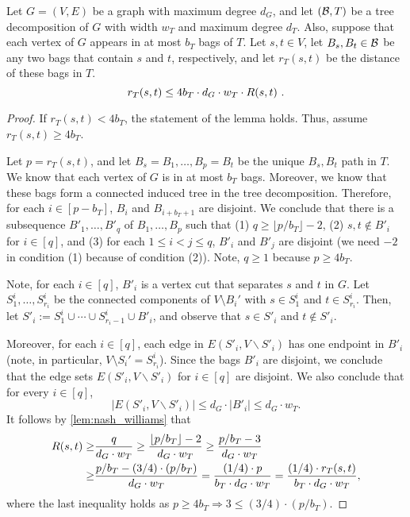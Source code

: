 \begin{lemma}
\label{lem:er_vs_tree_decomp_distance}
    Let $G=(V,E)$ be a graph with maximum degree $d_G$, and let $({\cal B}, T)$ be a tree decomposition of $G$ with width $w_T$ and maximum degree $d_T$.
    Also, suppose that each vertex of $G$ appears in at most $b_T$ bags of $T$.
    Let $s,t\in V$, let $B_s, B_t\in {\cal B}$ be any two bags that contain $s$ and $t$, respectively, and let $r_T(s,t)$ be the distance of these bags in $T$. 
    \[
    r_T(s,t) \leq {4b_T\cdot d_G\cdot w_T}\cdot R(s,t)  \ \text{.}
    \]
\end{lemma}
\begin{proof}
    If $r_T(s,t) < 4b_T$, the statement of the lemma holds. Thus, assume $r_T(s,t) \geq 4b_T$.
    
    Let $p = r_T(s,t)$, and let $B_s = B_1, \ldots, B_p = B_t$ be the unique $B_s, B_t$ path in $T$.
     We know that each vertex of $G$ is in at most $b_T$ bags.  Moreover, we know that these bags form a connected induced tree in the tree decomposition.
     Therefore, for each 
     $i\in [p-b_T]$, $B_i$ and $B_{i+b_T+1}$ are disjoint.  
     We conclude that there is a subsequence $B'_1,\ldots, B'_q$ of $B_1, \ldots, B_p$ such that (1) $q \geq \lfloor p/b_T\rfloor  - 2$, (2) $s,t\not\in B'_i$ for $i\in [q]$, and (3) for each $1\leq i< j\leq q$, $B'_i$ and $B'_j$ are disjoint (we need $-2$ in condition (1) because of condition (2)).  Note, $q\geq 1$ because $p\geq 4b_T$. 
     
     Note, for each $i\in [q]$, $B'_i$ is a vertex cut that separates $s$ and $t$ in $G$. Let $S^i_1, \ldots, S^i_{r_i}$ be the connected components of %
     $V \setminus B_i'$ with $s\in S^i_1$ and $t\in S^i_{r_i}$.  Then, let
     $S'_i := S^i_1\cup \cdots \cup S^i_{r_i -1}\cup B'_i$, and observe that $s\in S'_i$ and $t\not\in S'_i$.

     Moreover, for each $i\in [q]$, each edge in %
     $E(S'_i, V\backslash S'_i)$%
     has one endpoint in $B'_i$ (note, in particular, $V \setminus S_i' = S_{r_i}^i$).  Since the bags $B'_i$ are disjoint, we conclude that the edge sets $E(S'_i, V\backslash S'_i)$ for $i\in [q]$ are disjoint.  We also conclude that for every $i \in [q]$,
     \[
        |E(S'_i, V\backslash S'_i)| \leq d_G\cdot |B'_i| \leq d_G\cdot w_T.
    \]
     It follows by \cref{lem:nash_williams} that %
     \begin{align*}
     R(s,t) \geq& \frac{q}{d_G\cdot w_T} \geq \frac{\lfloor p/b_T\rfloor  - 2}{d_G\cdot w_T}
     \geq \frac{p/b_T  - 3}{d_G\cdot w_T} \\
     \geq& \frac{p/b_T  - (3/4)\cdot (p/b_T)}{d_G\cdot w_T} 
      = \frac{(1/4)\cdot p}{b_T\cdot d_G\cdot w_T} =  \frac{(1/4)\cdot r_T(s, t)}{b_T\cdot d_G\cdot w_T},
     \end{align*}
     where the last inequality holds as $p\geq 4b_T \Rightarrow 3 \leq (3/4)\cdot(p/b_T)$.
\end{proof}
